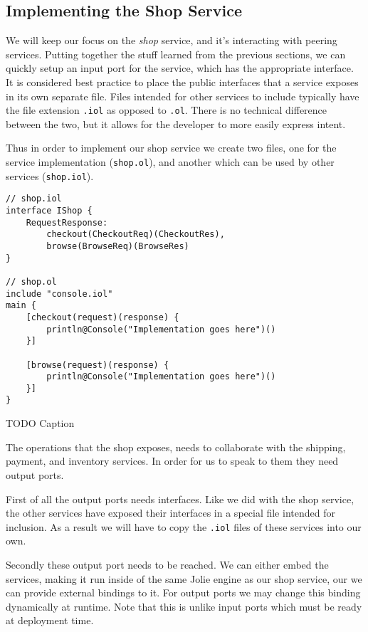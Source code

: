 \subsection{Implementing the Shop Service}

We will keep our focus on the \emph{shop} service, and it's interacting with
peering services. Putting together the stuff learned from the previous
sections, we can quickly setup an input port for the service, which has the
appropriate interface. It is considered best practice to place the public
interfaces that a service exposes in its own separate file. Files intended for
other services to include typically have the file extension \verb!.iol! as
opposed to \verb!.ol!. There is no technical difference between the two, but it
allows for the developer to more easily express intent.

Thus in order to implement our shop service we create two files, one for the
service implementation (\verb!shop.ol!), and another which can be used by other
services (\verb!shop.iol!).

\begin{listing}[H]
\begin{verbatim}
// shop.iol
interface IShop {
    RequestResponse:
        checkout(CheckoutReq)(CheckoutRes),
        browse(BrowseReq)(BrowseRes)
}

// shop.ol
include "console.iol"
main {
    [checkout(request)(response) {
        println@Console("Implementation goes here")()
    }]

    [browse(request)(response) {
        println@Console("Implementation goes here")()
    }]
}
\end{verbatim}
\caption{TODO Caption}
\label{lst:simple_start}
\end{listing}

The operations that the shop exposes, needs to collaborate with the shipping,
payment, and inventory services. In order for us to speak to them they need
output ports.

First of all the output ports needs interfaces. Like we did with the shop
service, the other services have exposed their interfaces in a special file
intended for inclusion. As a result we will have to copy the
\texttt{.iol} files of these services into our own.

Secondly these output port needs to be reached. We can either embed the
services, making it run inside of the same Jolie engine as our shop service,
our we can provide external bindings to it. For output ports we may change this
binding dynamically at runtime. Note that this is unlike input ports which must
be ready at deployment time.

